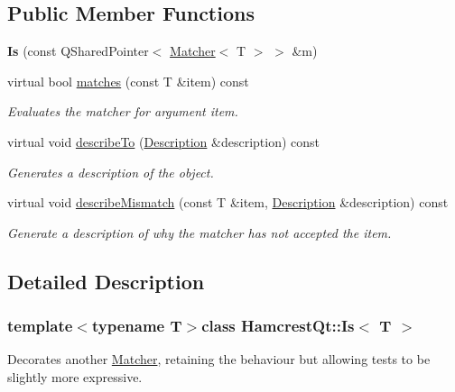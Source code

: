 \subsection*{Public Member Functions}
\begin{DoxyCompactItemize}
\item 
\hypertarget{class_hamcrest_qt_1_1_is_aa2ab2ed0ac9f749371982ddc159806a2}{{\bfseries Is} (const Q\-Shared\-Pointer$<$ \hyperlink{class_hamcrest_qt_1_1_matcher}{Matcher}$<$ T $>$ $>$ \&m)}\label{class_hamcrest_qt_1_1_is_aa2ab2ed0ac9f749371982ddc159806a2}

\item 
virtual bool \hyperlink{class_hamcrest_qt_1_1_is_ab8ab441f01e21785134ec0bbfb53f0b4}{matches} (const T \&item) const 
\begin{DoxyCompactList}\small\item\em Evaluates the matcher for argument {\itshape item}. \end{DoxyCompactList}\item 
virtual void \hyperlink{class_hamcrest_qt_1_1_is_adcddba2f01e78feaff9f75ab3c5c7dd2}{describe\-To} (\hyperlink{class_hamcrest_qt_1_1_description}{Description} \&description) const 
\begin{DoxyCompactList}\small\item\em Generates a description of the object. \end{DoxyCompactList}\item 
virtual void \hyperlink{class_hamcrest_qt_1_1_is_a3a8c6b52b2b0636e24b60542359ba12e}{describe\-Mismatch} (const T \&item, \hyperlink{class_hamcrest_qt_1_1_description}{Description} \&description) const 
\begin{DoxyCompactList}\small\item\em Generate a description of why the matcher has not accepted the item. \end{DoxyCompactList}\end{DoxyCompactItemize}


\subsection{Detailed Description}
\subsubsection*{template$<$typename T$>$class Hamcrest\-Qt\-::\-Is$<$ T $>$}

Decorates another \hyperlink{class_hamcrest_qt_1_1_matcher}{Matcher}, retaining the behaviour but allowing tests to be slightly more expressive. 

